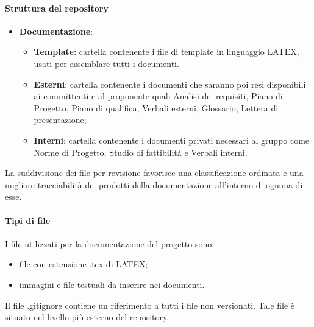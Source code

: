 			\paragraph{Struttura del repository}
				\begin{itemize}
					\item\textbf{Documentazione}:
						\begin{itemize}
							\item\textbf{Template}: cartella contenente i file di template in linguaggio LATEX, usati per assemblare tutti i documenti. 
							\item\textbf{Esterni}: cartella contenente i documenti che saranno poi resi disponibili ai committenti e al proponente quali Analisi dei requisiti, Piano di Progetto, Piano di qualifica, Verbali esterni, Glossario, Lettera di presentazione;
							\item\textbf{Interni}: cartella contenente i documenti privati necessari al gruppo come Norme di Progetto, Studio di fattibilità e Verbali interni.
							
						\end{itemize}
				\end{itemize}
				La suddivisione dei file per revisione favorisce una classificazione ordinata e una migliore tracciabilità dei prodotti della documentazione all’interno di ognuna di esse.
			\paragraph{Tipi di file}
				I file utilizzati per la documentazione del progetto sono:
				\begin{itemize}
					\item file con estensione .tex di LATEX;
					\item immagini e file testuali da inserire nei documenti.
				\end{itemize}
				Il file .gitignore contiene un riferimento a tutti i file non versionati. Tale file è situato nel livello più esterno del repository.
